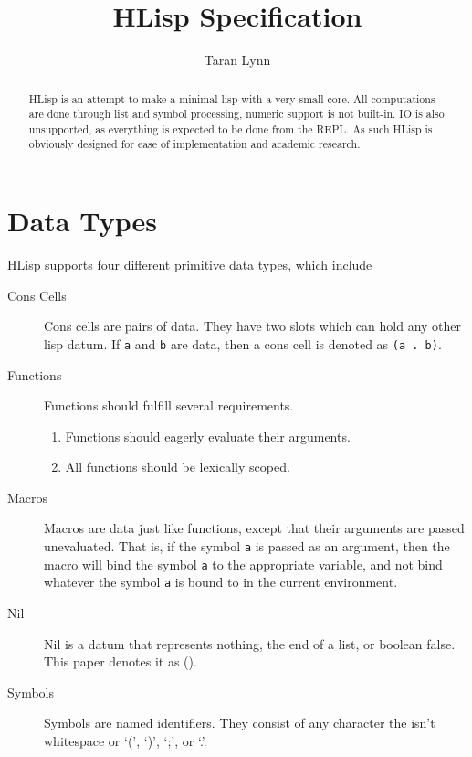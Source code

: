 \documentclass[12pt]{article}
\title{HLisp Specification}
\author{Taran Lynn}
\begin{document}
\maketitle

\begin{abstract}
  HLisp is an attempt to make a minimal lisp with a very small core. All
  computations are done through list and symbol processing, numeric support is
  not built-in. IO is also unsupported, as everything is expected to be done
  from the REPL. As such HLisp is obviously designed for ease of implementation
  and academic research.
\end{abstract}

\tableofcontents

\pagebreak



\section{Data Types}

HLisp supports four different primitive data types, which include

\begin{description}
\item[Cons Cells] Cons cells are pairs of data. They have two slots which can
  hold any other lisp datum. If \verb!a! and \verb!b! are data, then a cons
  cell is denoted as \verb!(a . b)!.

\item[Functions] Functions should fulfill several requirements.
  \begin{enumerate}
  \item Functions should eagerly evaluate their arguments.

  \item All functions should be lexically scoped.
  \end{enumerate}

\item[Macros] Macros are data just like functions, except that their arguments
  are passed unevaluated. That is, if the symbol \verb!a! is passed as an
  argument, then the macro will bind the symbol \verb!a! to the appropriate
  variable, and not bind whatever the symbol \verb!a! is bound to in the current
  environment.

\item[Nil] Nil is a datum that represents nothing, the end of a list, or boolean
  false. This paper denotes it as ().

\item[Symbols] Symbols are named identifiers. They consist of any character the
  isn't whitespace or `(', `)', `;', or `.'.
\end{description}
\end{document}
